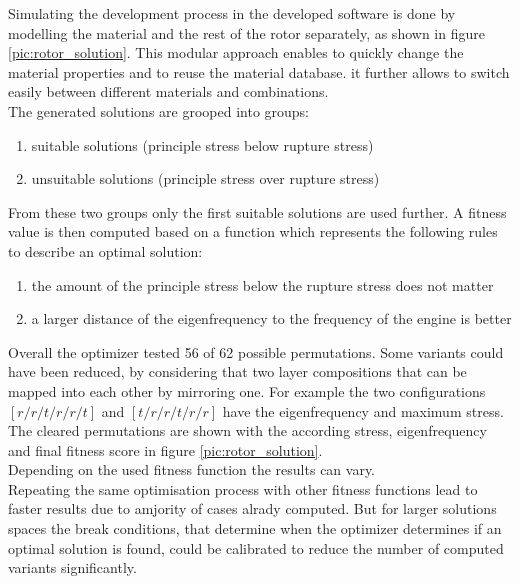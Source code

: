 Simulating the development process in the developed software is done by 
modelling the material and the rest of the rotor separately, as shown in figure \ref{pic:rotor_solution}.
This modular approach enables to quickly change the material properties and to reuse the material database.
it further allows to switch easily between different materials and combinations.\\
The generated solutions are grooped into groups:
\begin{enumerate}
    \item suitable solutions (principle stress below rupture stress)
    \item unsuitable solutions (principle stress over rupture stress)
\end{enumerate}
From these two groups only the first suitable solutions are used further.
A fitness value is then computed based on a function which represents the following rules to describe an optimal solution:
\begin{enumerate}
    \item the amount of the principle stress below the rupture stress does not matter
    \item a larger distance of the eigenfrequency to the frequency of the engine is better
\end{enumerate}
Overall the optimizer tested 56 of 62 possible permutations.
Some variants could have been reduced, by considering that two layer compositions that can be mapped into each other by mirroring one.
For example the two configurations $[r/r/t/r/r/t]$ and $[t/r/r/t/r/r]$ have the eigenfrequency and maximum stress.
The cleared permutations are shown with the according stress, eigenfrequency and final fitness score in figure \ref{pic:rotor_solution}.\\
Depending on the used fitness function the results can vary.\\ 
Repeating the same optimisation process with other fitness functions lead to faster results due to amjority of cases alrady computed.
But for larger solutions spaces the break conditions, 
that determine when the optimizer determines if an optimal solution is found,
could be calibrated to reduce the number of computed variants significantly.
